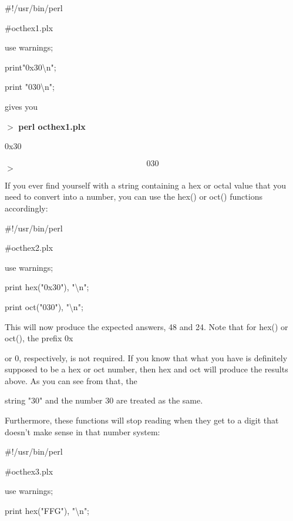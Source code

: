 \documentclass[a4paper,11pt]{book}
\begin{document}
\noindent 

\noindent 

\noindent \#!/usr/bin/perl

\noindent \#octhex1.plx

\noindent use warnings;

\noindent print"0x30\textbackslash n";

\noindent print "030\textbackslash n";

\noindent 

\noindent gives you

\noindent 

\noindent $>$ \textbf{perl octhex1.plx}

\noindent 0x30

\[030\] 
$>$

\noindent 

\noindent If you ever find yourself with a string containing a hex or octal value that you need to convert into a number, you can use the hex() or oct() functions accordingly:

\noindent 

\noindent \#!/usr/bin/perl

\noindent \#octhex2.plx

\noindent use warnings;

\noindent print hex("0x30"), "\textbackslash n";

\noindent print oct("030"), "\textbackslash n";

\noindent 

\noindent This will now produce the expected answers, 48 and 24. Note that for hex() or oct(), the prefix 0x

\noindent or 0, respectively, is not required. If you know that what you have is definitely supposed to be a hex or oct number, then hex and oct will produce the results above. As you can see from that, the

\noindent string "30" and the number 30 are treated as the same.

\noindent 

\noindent Furthermore, these functions will stop reading when they get to a digit that doesn't make sense in that number system:

\noindent 

\noindent \#!/usr/bin/perl

\noindent \#octhex3.plx

\noindent use warnings;

\noindent print hex("FFG"), "\textbackslash n";
\end{document}
